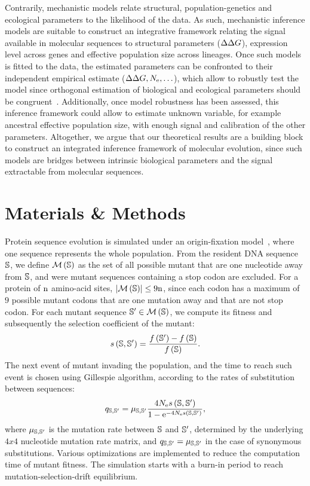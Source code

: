 Contrarily, mechanistic models relate structural, population-genetics and ecological parameters to the likelihood of the data.
As such, mechanistic inference models are suitable to construct an integrative framework relating the signal available in molecular sequences to structural parameters ($\Delta \Delta G$), expression level across genes and effective population size across lineages.
Once such models is fitted to the data, the estimated parameters can be confronted to their independent empirical estimate ($\Delta \Delta G, N_{\mathrm{e}}, \hdots$), which allow to robustly test the model since orthogonal estimation of biological and ecological parameters should be congruent~\citep{Dasmeh2014}.
Additionally, once model robustness has been assessed, this inference framework could allow to estimate unknown variable, for example ancestral effective population size, with enough signal and calibration of the other parameters.
Altogether, we argue that our theoretical results are a building block to construct an integrated inference framework of molecular evolution, since such models are bridges between intrinsic biological parameters and the signal extractable from molecular sequences.


\section{Materials \& Methods}
Protein sequence evolution is simulated under an origin-fixation model~\citep{McCandlish2014}, where one sequence represents the whole population.
From the resident \acrshort{DNA} sequence $\mathbb{S}$, we define $\mathcal{M}\left(\mathbb{S}\right)$ as the set of all possible mutant that are one nucleotide away from $\mathbb{S}$, and were mutant sequences containing a stop codon are excluded.
For a protein of $\text{n}$ amino-acid sites, $\left| \mathcal{M}\left(\mathbb{S}\right) \right| \leq 9 \text{n}$, since each codon has a maximum of $9$ possible mutant codons that are one mutation away and that are not stop codon.
For each mutant sequence $\mathbb{S}' \in \mathcal{M}\left(\mathbb{S}\right)$, we compute its fitness and subsequently the selection coefficient of the mutant:
\begin{equation}
    s \left( \mathbb{S},\mathbb{S}'\right) = \dfrac{ f \left(\mathbb{S}' \right) - f \left(\mathbb{S}\right) }{f\left( \mathbb{S}\right)}.
\end{equation}
The next event of mutant invading the population, and the time to reach such event is chosen using Gillespie algorithm, according to the rates of substitution between sequences:
\begin{equation}
    q_{\mathbb{S}, \mathbb{S}'} = \mu_{\mathbb{S}, \mathbb{S}'} \dfrac{4 N_{\mathrm{e}} s \left( \mathbb{S},\mathbb{S}'\right)}{1 - \mathrm{e}^{-4 N_{\mathrm{e}} s \left( \mathbb{S},\mathbb{S}'\right)}},
\end{equation}
where $\mu_{\mathbb{S}, \mathbb{S}'}$ is the mutation rate between $\mathbb{S}$ and $\mathbb{S}'$, determined by the underlying $4x4$ nucleotide mutation rate matrix, and ${q_{\mathbb{S}, \mathbb{S}'}} = \mu_{\mathbb{S}, \mathbb{S}'}$ in the case of synonymous substitutions.
Various optimizations are implemented to reduce the computation time of mutant fitness.
The simulation starts with a burn-in period to reach mutation-selection-drift equilibrium.

